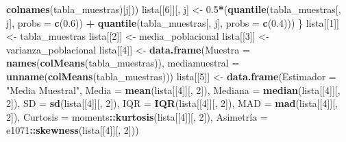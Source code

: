 \documentclass[
]{article}
\newenvironment{Shaded}{\begin{snugshade}}{\end{snugshade}}
\newcommand{\DataTypeTok}[1]{\textcolor[rgb]{0.13,0.29,0.53}{#1}}
\newcommand{\DecValTok}[1]{\textcolor[rgb]{0.00,0.00,0.81}{#1}}
\newcommand{\FloatTok}[1]{\textcolor[rgb]{0.00,0.00,0.81}{#1}}
\newcommand{\KeywordTok}[1]{\textcolor[rgb]{0.13,0.29,0.53}{\textbf{#1}}}
\newcommand{\NormalTok}[1]{#1}
\newcommand{\OperatorTok}[1]{\textcolor[rgb]{0.81,0.36,0.00}{\textbf{#1}}}
\newcommand{\StringTok}[1]{\textcolor[rgb]{0.31,0.60,0.02}{#1}}
\begin{document}
\begin{Shaded}
\begin{Highlighting}[]
{{                                                            \KeywordTok{colnames}\NormalTok{(tabla_muestras)[j]))}
\NormalTok{                lista[[}\DecValTok{6}\NormalTok{]][, j] <-}\StringTok{ }\FloatTok{0.5}\OperatorTok{*}\NormalTok{(}\KeywordTok{quantile}\NormalTok{(tabla_muestras[, j], }
                                                 \DataTypeTok{probs =} \KeywordTok{c}\NormalTok{(}\FloatTok{0.6}\NormalTok{)) }\OperatorTok{+}\StringTok{ }
\StringTok{                                                }\KeywordTok{quantile}\NormalTok{(tabla_muestras[, j], }
                                                         \DataTypeTok{probs =} \KeywordTok{c}\NormalTok{(}\FloatTok{0.4}\NormalTok{)))}
\NormalTok{        \}}
\NormalTok{        lista[[}\DecValTok{1}\NormalTok{]] <-}\StringTok{ }\NormalTok{tabla_muestras}
\NormalTok{        lista[[}\DecValTok{2}\NormalTok{]] <-}\StringTok{ }\NormalTok{media_poblacional}
\NormalTok{        lista[[}\DecValTok{3}\NormalTok{]] <-}\StringTok{ }\NormalTok{varianza_poblacional}
\NormalTok{        lista[[}\DecValTok{4}\NormalTok{]] <-}\StringTok{ }\KeywordTok{data.frame}\NormalTok{(}\DataTypeTok{Muestra =} \KeywordTok{names}\NormalTok{(}\KeywordTok{colMeans}\NormalTok{(tabla_muestras)), }
                                 \DataTypeTok{mediamuestral =} \KeywordTok{unname}\NormalTok{(}\KeywordTok{colMeans}\NormalTok{(tabla_muestras))) }
\NormalTok{        lista[[}\DecValTok{5}\NormalTok{]] <-}\StringTok{ }\KeywordTok{data.frame}\NormalTok{(}\DataTypeTok{Estimador =} \StringTok{"Media Muestral"}\NormalTok{, }
                                 \DataTypeTok{Media =} \KeywordTok{mean}\NormalTok{(lista[[}\DecValTok{4}\NormalTok{]][, }\DecValTok{2}\NormalTok{]),}
                                 \DataTypeTok{Mediana =} \KeywordTok{median}\NormalTok{(lista[[}\DecValTok{4}\NormalTok{]][, }\DecValTok{2}\NormalTok{]),}
                                 \DataTypeTok{SD =} \KeywordTok{sd}\NormalTok{(lista[[}\DecValTok{4}\NormalTok{]][, }\DecValTok{2}\NormalTok{]), }
                                 \DataTypeTok{IQR =} \KeywordTok{IQR}\NormalTok{(lista[[}\DecValTok{4}\NormalTok{]][, }\DecValTok{2}\NormalTok{]), }
                                 \DataTypeTok{MAD =} \KeywordTok{mad}\NormalTok{(lista[[}\DecValTok{4}\NormalTok{]][, }\DecValTok{2}\NormalTok{]), }
                                 \DataTypeTok{Curtosis =}\NormalTok{ moments}\OperatorTok{::}\KeywordTok{kurtosis}\NormalTok{(lista[[}\DecValTok{4}\NormalTok{]][, }\DecValTok{2}\NormalTok{]), }
\NormalTok{                                 Asimetrí}\DataTypeTok{a =}\NormalTok{ e1071}\OperatorTok{::}\KeywordTok{skewness}\NormalTok{(lista[[}\DecValTok{4}\NormalTok{]][, }\DecValTok{2}\NormalTok{]))}
}}
\end{Highlighting}
\end{Shaded}
\end{document}
